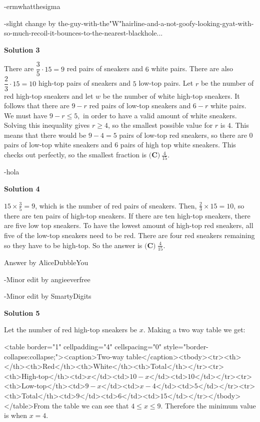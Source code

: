 \begin{enumerate}
 -ermwhatthesigma

 
-slight change by the-guy-with-the"W"hairline-and-a-not-goofy-looking-gyat-with-so-much-recoil-it-bounces-to-the-nearest-blackhole...

 



\textbf{Solution 3}

There are $\dfrac{3}{5}\cdot 15 = 9$ red pairs of sneakers and $6$ white pairs. There are also $\dfrac{2}{3}\cdot 15 = 10$ high-top pairs of sneakers and $5$ low-top pairs. Let $r$ be the number of red high-top sneakers and let $w$ be the number of white high-top sneakers. It follows that there are $9-r$ red pairs of low-top sneakers and $6-r$ white pairs. We must have $9-r \leq 5,$ in order to have a valid amount of white sneakers. Solving this inequality gives $r\geq 4$, so the smallest possible value for $r$ is $4$. This means that there would be $9-4=5$ pairs of low-top red sneakers, so there are $0$ pairs of low-top white sneakers and $6$ pairs of high top white sneakers. This checks out perfectly, so the smallest fraction is $\boxed{\textbf{(C)}\ \frac{4}{15}}.$

 -hola

 



\textbf{Solution 4}

$15 \times \frac{3}{5}=9$, which is the number of red pairs of sneakers. Then, $\frac{2}{3} \times 15=10$, so there are ten pairs of high-top sneakers.  If there are ten high-top sneakers, there are five low top sneakers. To have the lowest amount of high-top red sneakers, all five of the low-top sneakers need to be red. There are four red sneakers remaining so they have to be high-top. So the answer is $\boxed{\textbf{(C)}\ \frac{4}{15}}.$

 Answer by AliceDubbleYou

 -Minor edit by angieeverfree

 -Minor edit by SmartyDigits

 



\textbf{Solution 5}

Let the number of red high-top sneakers be $x$. Making a two way table we get:

 <table border="1" cellpadding="4" cellspacing="0" style="border-collapse:collapse;"><caption>Two-way table</caption><tbody><tr><th></th><th>Red</th><th>White</th><th>Total</th></tr><tr><th>High-top</th><td>$x$</td><td>$10 - x$</td><td>$10$</td></tr><tr><th>Low-top</th><td>$9-x$</td><td>$x-4$</td><td>$5$</td></tr><tr><th>Total</th><td>$9$</td><td>$6$</td><td>$15$</td></tr></tbody></table>From the table we can see that $4\leq x\leq 9$. Therefore the minimum value is when $x=4$.


\end{enumerate}
